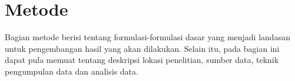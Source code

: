 \section{Metode} %


Bagian metode berisi tentang formulasi-formulasi dasar yang menjadi landasan untuk pengembangan hasil yang akan dilakukan. Selain itu, pada bagian ini dapat pula memuat tentang deskripsi lokasi penelitian, sumber data, teknik pengumpulan data dan analisis data.